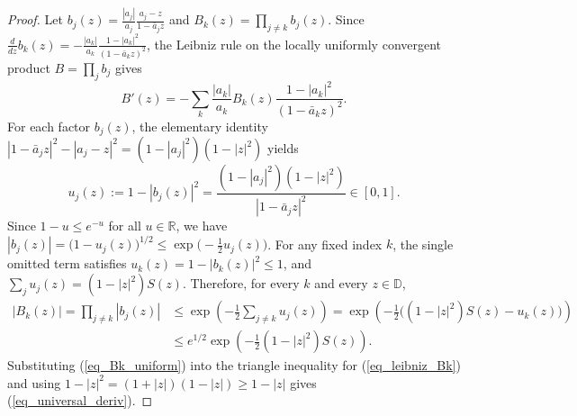 \documentclass[11pt,reqno]{amsart}
\numberwithin{equation}{section}
\newcommand{\R}{\mathbb{R}}
\newcommand{\D}{\mathbb{D}}
\begin{document}
\begin{proof}
Let $b_j(z) = \frac{|a_j|}{a_j} \frac{a_j - z}{1 - \bar{a}_j z}$ and $B_k(z) = \prod_{j \ne k} b_j(z)$. Since $\frac{d}{dz} b_k(z) = -\frac{|a_k|}{a_k} \frac{1 - |a_k|^2}{(1 - \bar{a}_k z)^2}$, the Leibniz rule on the locally uniformly convergent product $B = \prod_j b_j$ gives
\begin{equation} \label{eq_leibniz_Bk}
  B'(z) = -\sum_k \frac{|a_k|}{a_k} B_k(z) \frac{1 - |a_k|^2}{(1 - \bar{a}_k z)^2}.
\end{equation}
For each factor $b_j(z)$, the elementary identity $|1 - \bar{a}_j z|^2 - |a_j - z|^2 = (1 - |a_j|^2)(1 - |z|^2)$ yields
\begin{equation} \label{eq_u_j}
  u_j(z) := 1 - |b_j(z)|^2 = \frac{(1 - |a_j|^2)(1 - |z|^2)}{|1 - \bar{a}_j z|^2} \in [0, 1].
\end{equation}
Since $1 - u \le e^{-u}$ for all $u \in \R$, we have $|b_j(z)| = \bigl(1 - u_j(z)\bigr)^{1/2} \le \exp\bigl(-\frac{1}{2} u_j(z)\bigr)$. For any fixed index $k$, the single omitted term satisfies $u_k(z) = 1 - |b_k(z)|^2 \le 1$, and $\sum_j u_j(z) = (1 - |z|^2) S(z)$. Therefore, for every $k$ and every $z \in \D$,
\begin{align} \label{eq_Bk_uniform}
  |B_k(z)| = \prod_{j \ne k} |b_j(z)|
  &\le \exp\!\left(-\frac{1}{2} \sum_{j \ne k} u_j(z)\right)
  = \exp\!\left(-\frac{1}{2}\bigl((1 - |z|^2) S(z) - u_k(z)\bigr)\right) \nonumber \\
  &\le e^{1/2} \exp\!\left(-\frac{1}{2}(1 - |z|^2) S(z)\right).
\end{align}
Substituting (\ref{eq_Bk_uniform}) into the triangle inequality for (\ref{eq_leibniz_Bk}) and using $1 - |z|^2 = (1 + |z|)(1 - |z|) \ge 1 - |z|$ gives (\ref{eq_universal_deriv}).
\end{proof}
\end{document}
